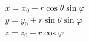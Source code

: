 \documentclass[12pt]{article}
\begin{document}
\[
    \begin{array}{l}
        x = x_0 + r\cos \theta\sin \varphi \\
        y = y_0 + r\sin \theta\sin \varphi \\
        z = z_0 + r\cos \varphi \\
    \end{array}
\]
\end{document}
